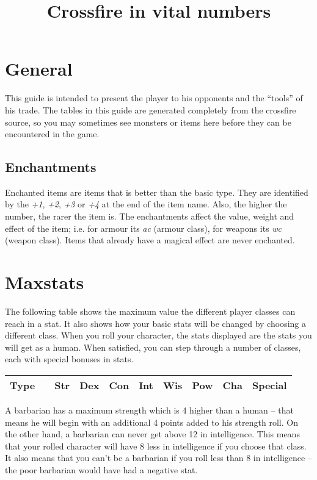 \documentclass[11pt, a4paper]{article}
\begin{document}
\title{Crossfire in vital numbers}
\author{

}
\maketitle
{}
\setlongtables


\section*{General}
This guide is intended to present the player to his opponents and the
``tools'' of his trade.  The tables in this guide are generated
completely from the crossfire source, so you may sometimes see
monsters or items here before they can be encountered in the game.

\subsection*{Enchantments}
Enchanted items are items that is better than the basic type.
They are identified by the {\it +1}, {\it +2}, {\it +3} or {\it +4} at
the end of the item name.
Also, the higher the number, the rarer the item is.
The enchantments affect the value, weight and effect of the item;
i.e. for armour its {\it ac} (armour class),
for weapons its {\it wc} (weapon class).
Items that already have a magical effect are never enchanted.


\section*{Maxstats}

The following table shows the maximum value the different player
classes can reach in a stat. It also shows how your basic stats will
be changed by choosing a different class. When you roll your
character, the stats displayed are the stats you will get as a human.
When satisfied, you can step through a number of classes, each with
special bonuses in stats.

{\small
\begin{center}
\begin{tabular}{|c|c|l|l|l|l|l|l|l|p{4cm}|}
\hline
Type& &         Str&    Dex&    Con&    Int&    Wis&    Pow& Cha &Special\\
\hline
\hline

\hline
\end{tabular}
\end{center}
}

A barbarian has a maximum strength which is 4 higher than a human --
that means he will begin with an additional 4 points added to his
strength roll. On the other hand, a barbarian can never get above 12
in intelligence.  This means that your rolled character will have 8
less in intelligence if you choose that class.  It also means that you
can't be a barbarian if you roll less than 8 in intelligence -- the
poor barbarian would have had a negative stat.
\end{document}
